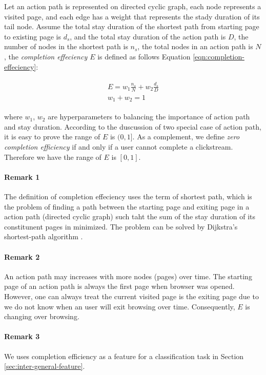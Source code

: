 Let an action path is represented on directed cyclic graph, each node represents a visited page,
and each edge has a weight that represents the stady duration of its tail node.
Assume the total stay duration of the shortest path from starting page to existing page
is $d_s$, and the total stay duration of the action path is $D$, 
the number of nodes in the shortest path is $n_s$, the total nodes 
in an action path is $N$, the \emph{completion effeciency $E$} is defined 
as follows Equation \ref{eqn:completion-effeciency}:

\begin{align}
\label{eqn:completion-effeciency}
\begin{split}
    E = w_1 \frac{n_s}{N} + w_2 \frac{d_s}{D}\\
    w_1 + w_2 = 1
\end{split}
\end{align}

where $w_1$, $w_2$ are hyperparameters to balancing the importance of action path 
and stay duration. According to the duscussion of two special case of action path,
it is easy to prove the range of $E$ is $(0, 1]$. As a complement, we define \emph{zero
completion efficiency} if and only if a user cannot complete a clickstream. Therefore
we have the range of $E$ is $[0, 1]$.

\paragraph{Remark 1} The definition of completion effeciency uses the term of shortest path,
which is the problem of finding a path between the starting page and exiting page
 in a action path (directed cyclic graph) such taht the sum of
the stay duration of its constitunent pages in minimized.
The problem can be solved by Dijkstra's shortest-path algorithm \cite{dijkstra1959note}.

\paragraph{Remark 2} An action path may increases with more nodes (pages) over time.
The starting page of an action path is always the first page when browser was opened.
However, one can always treat the current visited page is the exiting page due to we
do not know when an user will exit browsing over time. Consequently, $E$ is changing over
browsing.

\paragraph{Remark 3} We uses completion efficiency as a
feature for a classification task in Section \ref{sec:inter-general-feature}.

